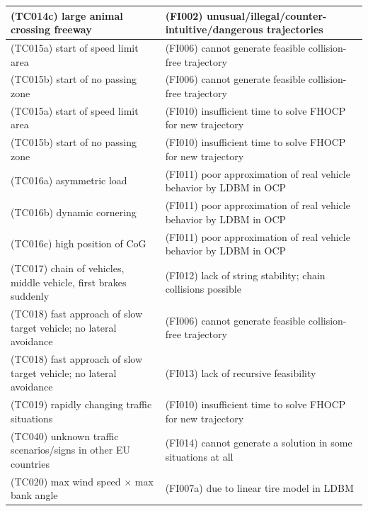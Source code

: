 \documentclass{article}
\begin{document}
\begin{longtable}{|p{8cm}|p{8cm}|}
\cellcolor{cGreen}(TC014c) large animal crossing freeway& \cellcolor{cBlue}(FI002) unusual/illegal/counter-intuitive/dangerous trajectories\\\hline
\cellcolor{cYellow}(TC015a) start of speed limit area& \cellcolor{cBlue}(FI006) cannot generate feasible collision-free trajectory\\\hline
\cellcolor{cYellow}(TC015b) start of no passing zone& \cellcolor{cBlue}(FI006) cannot generate feasible collision-free trajectory\\\hline
\cellcolor{cYellow}(TC015a) start of speed limit area& \cellcolor{cBlue}(FI010) insufficient time to solve FHOCP for new trajectory\\\hline
\cellcolor{cYellow}(TC015b) start of no passing zone& \cellcolor{cBlue}(FI010) insufficient time to solve FHOCP for new trajectory\\\hline
\cellcolor{cViolet}(TC016a) asymmetric load& \cellcolor{cBlue}(FI011) poor approximation of real vehicle behavior by LDBM in OCP\\\hline
\cellcolor{cViolet}(TC016b) dynamic cornering& \cellcolor{cBlue}(FI011) poor approximation of real vehicle behavior by LDBM in OCP\\\hline
\cellcolor{cViolet}(TC016c) high position of CoG& \cellcolor{cBlue}(FI011) poor approximation of real vehicle behavior by LDBM in OCP\\\hline
\cellcolor{cGreen}(TC017) chain of vehicles, middle vehicle, first brakes suddenly& \cellcolor{cBlue}(FI012) lack of string stability; chain collisions possible\\\hline
\cellcolor{cGreen}(TC018) fast approach of slow target vehicle; no lateral avoidance& \cellcolor{cBlue}(FI006) cannot generate feasible collision-free trajectory\\\hline
\cellcolor{cGreen}(TC018) fast approach of slow target vehicle; no lateral avoidance& \cellcolor{cBlue}(FI013) lack of recursive feasibility\\\hline
\cellcolor{cGreen}(TC019) rapidly changing traffic situations& \cellcolor{cBlue}(FI010) insufficient time to solve FHOCP for new trajectory\\\hline
\cellcolor{cYellow}(TC040) unknown traffic scenarios/signs in other EU countries& \cellcolor{cBlue}(FI014) cannot generate a solution in some situations at all\\\hline
\cellcolor{cRed}(TC020) max wind speed × max bank angle& \cellcolor{cBlue}(FI007a) due to linear tire model in LDBM\\\hline

\end{longtable}
\end{document}
